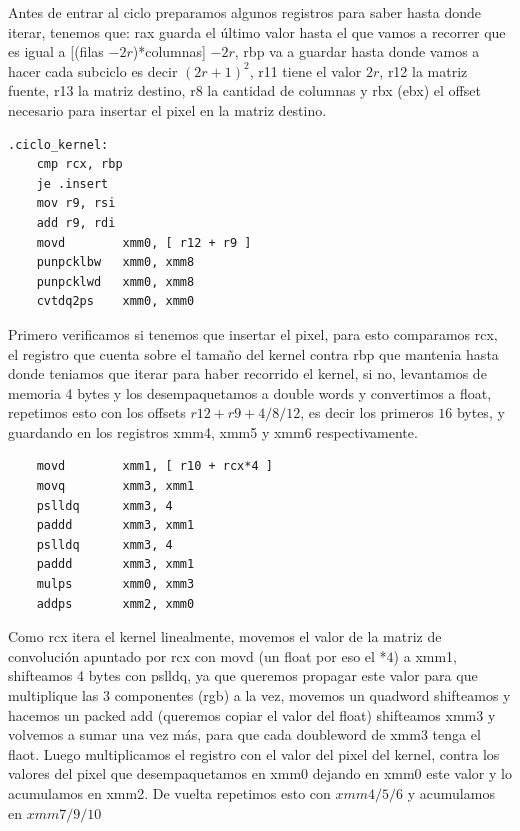\documentclass[a4paper]{article}
\begin{document}
 Antes de entrar al ciclo preparamos algunos registros para saber hasta donde iterar, tenemos que: rax guarda el último valor hasta el que vamos a recorrer que es igual a  [(filas $- 2r$)*columnas] $-2r$, rbp va a guardar hasta donde vamos a hacer cada subciclo es decir $(2r+1)^2$, r11 tiene el valor $2r$, r12 la matriz fuente, r13 la matriz destino, r8 la cantidad de columnas y rbx (ebx) el offset necesario para insertar el pixel en la matriz destino.
\begin{codesnippet}
\begin{verbatim}
.ciclo_kernel:
    cmp rcx, rbp                      
    je .insert          
    mov r9, rsi
    add r9, rdi
    movd        xmm0, [ r12 + r9 ]      
    punpcklbw   xmm0, xmm8              
    punpcklwd   xmm0, xmm8              
    cvtdq2ps    xmm0, xmm0    
\end{verbatim}
\end{codesnippet}

 Primero verificamos si tenemos que insertar el pixel, para esto comparamos rcx, el registro que cuenta sobre el tamaño del kernel contra rbp que mantenia hasta donde teniamos que iterar para haber recorrido el kernel, si no, levantamos de memoria 4 bytes y los desempaquetamos a double words y convertimos a float, repetimos esto con los offsets $r12 + r9 + 4/8/12$, es decir los primeros $16$ bytes, y guardando en los registros xmm4, xmm5 y xmm6 respectivamente.
\begin{codesnippet}
\begin{verbatim}    
    movd        xmm1, [ r10 + rcx*4 ]   
    movq        xmm3, xmm1              
    pslldq      xmm3, 4
    paddd       xmm3, xmm1              
    pslldq      xmm3, 4
    paddd       xmm3, xmm1                           
    mulps       xmm0, xmm3              
    addps       xmm2, xmm0              

\end{verbatim}
\end{codesnippet}

Como rcx itera el kernel linealmente, movemos el valor de la matriz de convolución apuntado por rcx con movd (un float por eso el *$4$) a xmm1, shifteamos 4 bytes con pslldq, ya que queremos propagar este valor para que multiplique las 3 componentes (rgb) a la vez, movemos un quadword shifteamos y hacemos un packed add (queremos copiar el valor del float) shifteamos xmm3 y volvemos a sumar una vez más, para que cada doubleword de xmm3 tenga el flaot. Luego multiplicamos el registro con el valor del pixel del kernel, contra los valores del pixel que desempaquetamos en xmm0 dejando en xmm0 este valor y lo acumulamos en xmm2. De vuelta repetimos esto con $xmm4/5/6$ y acumulamos en $xmm7/9/10$
\end{document}
